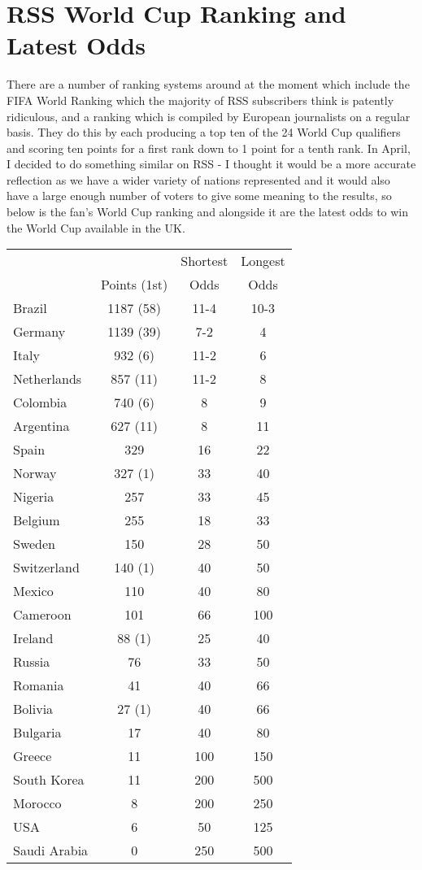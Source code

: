 \chapter{RSS World Cup Ranking and Latest Odds}
\newline
\newline
There are a number of ranking systems around at the moment which include the
FIFA World Ranking which the majority of RSS subscribers think is patently 
ridiculous, and a ranking which is compiled by European journalists on a 
regular basis. They do this by each producing a top ten of the 24 World Cup
qualifiers and scoring ten points for a first rank down to 1 point for a tenth
rank. In April, I decided to do something similar on RSS - I thought it would
be a more accurate reflection as we have a wider variety of nations represented
and it would also have a large enough number of voters to give some meaning to
the results, so below is the fan's World Cup ranking and alongside it are the 
latest odds to win the World Cup available in the UK.
\begin{tabular}{l c c c}
& & Shortest & Longest \\
& Points (1st) & Odds & Odds \\ \hline
Brazil & 1187 (58) & 11-4 &  10-3 \\
Germany & 1139 (39) &  7-2 & 4 \\
Italy & 932 (6) & 11-2 & 6 \\
Netherlands & 857 (11) & 11-2 & 8 \\
Colombia & 740 (6) & 8 & 9 \\
Argentina & 627 (11) & 8 & 11 \\
Spain & 329 & 16 & 22 \\
Norway & 327 (1) & 33 & 40 \\
Nigeria & 257 & 33 & 45 \\
Belgium & 255 & 18 & 33 \\
Sweden &  150 & 28 & 50 \\
Switzerland &140 (1) & 40 & 50 \\
Mexico & 110 & 40 & 80 \\
Cameroon & 101 & 66 & 100 \\
Ireland &  88 (1) & 25 & 40 \\
Russia & 76 & 33 & 50 \\
Romania & 41 & 40 & 66 \\
Bolivia &  27 (1) & 40 & 66 \\
Bulgaria & 17 & 40 & 80 \\
Greece &11 & 100 & 150 \\
South Korea & 11 & 200 &  500 \\
Morocco & 8 & 200 &  250 \\
USA & 6 & 50 & 125 \\
Saudi Arabia & 0 & 250 &  500 \\
\end{tabular}
